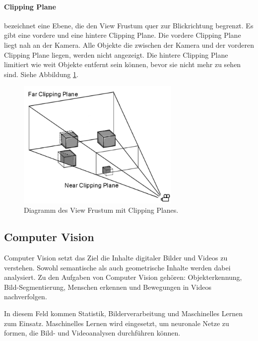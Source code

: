 \paragraph{Clipping Plane}
bezeichnet eine Ebene, die den View Frustum quer zur Blickrichtung begrenzt. Es gibt eine vordere und eine hintere Clipping Plane. Die vordere Clipping Plane liegt nah an der Kamera. Alle Objekte die zwischen der Kamera und der vorderen Clipping Plane liegen, werden nicht angezeigt. Die hintere Clipping Plane limitiert wie weit Objekte entfernt sein können, bevor sie nicht mehr zu sehen sind. Siehe Abbildung \ref{dia:clipping}.\citep{unityclipping}

\begin{figure}[H]
	\centering
	\includegraphics[width=0.7\textwidth]{images/dia_ViewFrustum.png}
	\caption[View Frustum]{Diagramm des View Frustum mit Clipping Planes.}
	\label{dia:clipping}
\end{figure}


\subsection{Computer Vision}
Computer Vision setzt das Ziel die Inhalte digitaler Bilder und Videos zu verstehen. Sowohl semantische als auch geometrische Inhalte werden dabei analysiert. 
Zu den Aufgaben von Computer Vision gehören: Objekterkennung, Bild-Segmentierung, Menschen erkennen und Bewegungen in Videos nachverfolgen.

In diesem Feld kommen Statistik, Bilderverarbeitung und Maschinelles Lernen zum Einsatz. Maschinelles Lernen wird eingesetzt, um neuronale Netze zu formen, die Bild- und Videoanalysen durchführen können.\citep{intortodeeplearingmedical}

